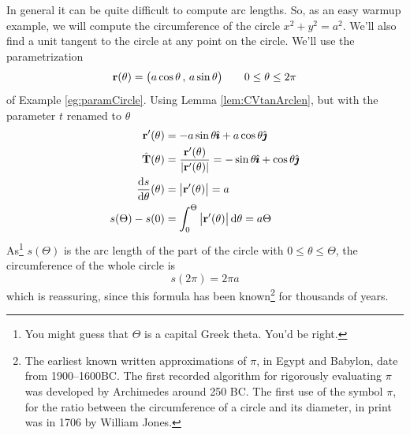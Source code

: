 \begin{eg}\label{eg:paramCircleTan}
In general it can be quite difficult to compute arc lengths.
So, as an easy warmup example, we will compute the circumference of the circle
$x^2+y^2=a^2$. We'll also find a unit tangent to the circle at any point on
the circle. We'll use the parametrization
\begin{equation*}
\mathbf{r}(\theta) = \big(a\cos\theta\,,\,a\sin\theta\big)\qquad
0\le \theta\le 2\pi
\end{equation*}
of Example \ref{eg:paramCircle}. Using Lemma \ref{lem:CVtanArclen},
but with the parameter $t$ renamed to $\theta$
\begin{align*}
\vr'(\theta) &= -a\sin\theta\hi + a\cos\theta\hj \\
\hat\vT(\theta) &= \frac{\vr'(\theta)}{|\vr'(\theta)|}
               =  -\sin\theta\hi + \cos\theta\hj \\
\diff{s}{\theta}(\theta)&=\big|\vr'(\theta)\big| = a\\
s(\Theta)-s(0)&= \int_{0}^\Theta \big|\vr'(\theta)\big|\,\dee{\theta}
          =a\Theta
\end{align*}
As\footnote{You might guess that $\Theta$ is a capital Greek theta. You'd be right.} $s(\Theta)$ is the arc length of the part of the circle with 
$0\le\theta\le\Theta$, the circumference of the whole circle is
\begin{equation*}
s(2\pi) = 2\pi a
\end{equation*} 
which is reassuring, since this formula has been known\footnote{The earliest known written approximations of $\pi$, in Egypt and Babylon, date 
from 1900--1600BC. The first recorded algorithm for rigorously evaluating $\pi$
was developed by Archimedes around 250 BC. The first use of the symbol $\pi$,
for the ratio between the circumference of a circle and its diameter,
in print was in 1706 by William Jones.}
for thousands of years.%
\end{eg}
